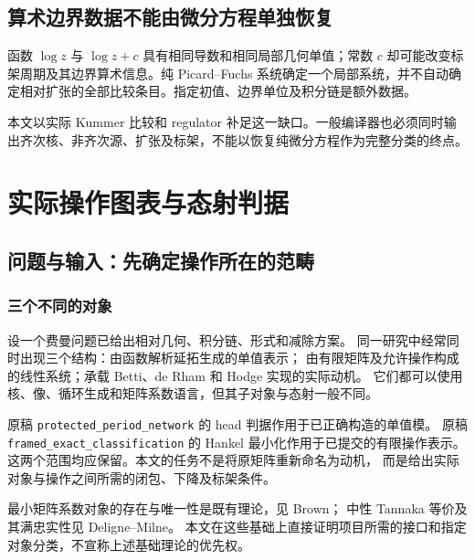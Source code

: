\documentclass[11pt,a4paper,oneside]{ctexart}
\theoremstyle{cnplain}
\theoremstyle{definition}
\theoremstyle{remark}
\newcommand{\Q}{\mathbb Q}
\newcommand{\C}{\mathbb C}
\newcommand{\End}{\operatorname{End}}
\newcommand{\Hom}{\operatorname{Hom}}
\newcommand{\rank}{\operatorname{rank}}
\newcommand{\im}{\operatorname{im}}
\newcommand{\id}{\operatorname{id}}
\newcommand{\dR}{\mathrm{dR}}
\numberwithin{equation}{section}
\begin{document}
\subsection{算术边界数据不能由微分方程单独恢复}
函数 $\log z$ 与 $\log z+c$ 具有相同导数和相同局部几何单值；常数 $c$ 却可能改变标架周期及其边界算术信息。纯 Picard--Fuchs 系统确定一个局部系统，并不自动确定相对扩张的全部比较条目。指定初值、边界单位及积分链是额外数据。

本文以实际 Kummer 比较和 regulator 补足这一缺口。一般编译器也必须同时输出齐次核、非齐次源、扩张及标架，不能以恢复纯微分方程作为完整分类的终点。




\endgroup

\section{实际操作图表与态射判据}\label{ch:ops}

\begingroup
\providecommand{\Q}{\mathbb Q}
\providecommand{\C}{\mathbb C}
\providecommand{\dR}{\mathrm{dR}}
\providecommand{\id}{\operatorname{id}}
\providecommand{\im}{\operatorname{im}}
\providecommand{\End}{\operatorname{End}}
\providecommand{\Hom}{\operatorname{Hom}}
\providecommand{\Vis}{\operatorname{Vis}}
\providecommand{\soc}{\operatorname{soc}}
\providecommand{\head}{\operatorname{head}}
\providecommand{\rank}{\operatorname{rank}}
\subsection{问题与输入：先确定操作所在的范畴}
\subsubsection{三个不同的对象}
设一个费曼问题已给出相对几何、积分链、形式和减除方案。
同一研究中经常同时出现三个结构：由函数解析延拓生成的单值表示；
由有限矩阵及允许操作构成的线性系统；承载 Betti、de Rham 和 Hodge 实现的实际动机。
它们都可以使用核、像、循环生成和矩阵系数语言，但其子对象与态射一般不同。

原稿 \nolinkurl{protected_period_network} 的 head 判据作用于已正确构造的单值模。
原稿 \nolinkurl{framed_exact_classification} 的 Hankel 最小化作用于已提交的有限操作表示。
这两个范围均应保留。本文的任务不是将原矩阵重新命名为动机，
而是给出实际对象与操作之间所需的闭包、下降及标架条件。

最小矩阵系数对象的存在与唯一性是既有理论，见 Brown\cite[\S2.4]{brownperiods}；
中性 Tannaka 等价及其满忠实性见 Deligne--Milne\cite[Theorem 2.11]{delignemilne}。
本文在这些基础上直接证明项目所需的接口和指定对象分类，不宣称上述基础理论的优先权。
\end{document}
